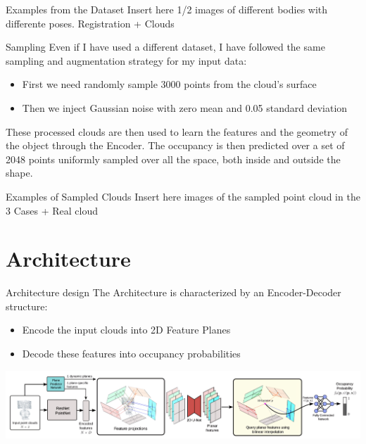 \documentclass{beamer}
\begin{document}
\begin{frame}{Examples from the Dataset}
Insert here 1/2 images of different bodies with differente poses. Registration + Clouds
\end{frame}

\begin{frame}{Sampling}
    Even if I have used a different dataset, I have followed the same sampling and augmentation strategy for my input data:
    \begin{itemize}
        \item First we need randomly sample 3000 points from the cloud's surface
        \item Then we inject Gaussian noise with zero mean and 0.05 standard deviation
    \end{itemize}
    These processed clouds are then used to learn the features and the geometry of the object through the Encoder.
    The occupancy is then predicted over a set of 2048 points uniformly sampled over all the space, both inside and outside the shape.
\end{frame}

\begin{frame}{Examples of Sampled Clouds}
Insert here images of the sampled point cloud in the 3 Cases + Real cloud
\end{frame}

\section{Architecture}

\begin{frame}{Architecture design}
The Architecture is characterized by an Encoder-Decoder structure:
\begin{itemize}
\item Encode the input clouds into 2D Feature Planes
\item Decode these features into occupancy probabilities
\end{itemize}
\includegraphics[width=\textwidth]{../media/architecture.png}
\end{frame}
\end{document}
